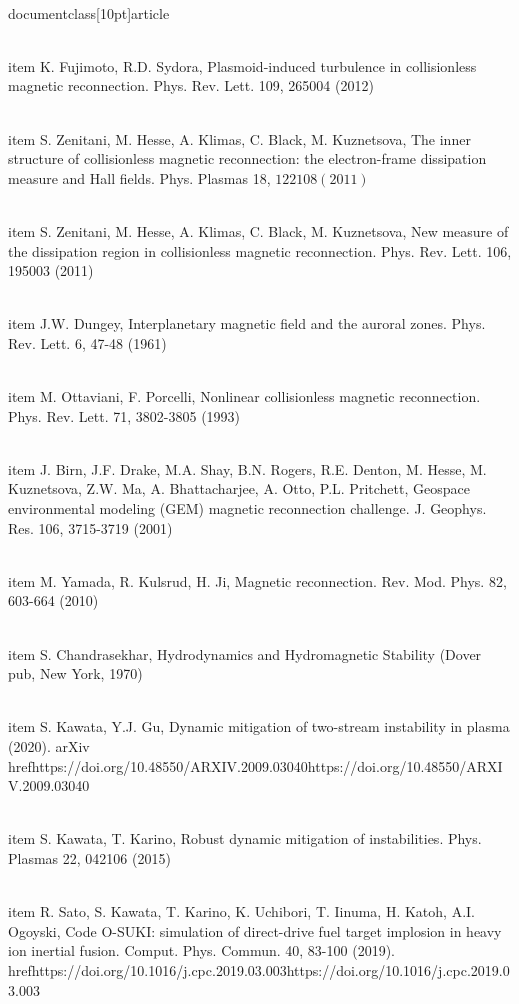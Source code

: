 \\documentclass[10pt]{article}
\begin{document}
{{{{{{  \\item K. Fujimoto, R.D. Sydora, Plasmoid-induced turbulence in collisionless magnetic reconnection. Phys. Rev. Lett. 109, 265004 (2012)

  \\item S. Zenitani, M. Hesse, A. Klimas, C. Black, M. Kuznetsova, The inner structure of collisionless magnetic reconnection: the electron-frame dissipation measure and Hall fields. Phys. Plasmas 18, $122108(2011)$

  \\item S. Zenitani, M. Hesse, A. Klimas, C. Black, M. Kuznetsova, New measure of the dissipation region in collisionless magnetic reconnection. Phys. Rev. Lett. 106, 195003 (2011)

  \\item J.W. Dungey, Interplanetary magnetic field and the auroral zones. Phys. Rev. Lett. 6, 47-48 (1961)

  \\item M. Ottaviani, F. Porcelli, Nonlinear collisionless magnetic reconnection. Phys. Rev. Lett. 71, 3802-3805 (1993)

  \\item J. Birn, J.F. Drake, M.A. Shay, B.N. Rogers, R.E. Denton, M. Hesse, M. Kuznetsova, Z.W. Ma, A. Bhattacharjee, A. Otto, P.L. Pritchett, Geospace environmental modeling (GEM) magnetic reconnection challenge. J. Geophys. Res. 106, 3715-3719 (2001)

  \\item M. Yamada, R. Kulsrud, H. Ji, Magnetic reconnection. Rev. Mod. Phys. 82, 603-664 (2010)

  \\item S. Chandrasekhar, Hydrodynamics and Hydromagnetic Stability (Dover pub, New York, 1970)

  \\item S. Kawata, Y.J. Gu, Dynamic mitigation of two-stream instability in plasma (2020). arXiv \\href{https://doi.org/10.48550/ARXIV.2009.03040}{https://doi.org/10.48550/ARXIV.2009.03040}

  \\item S. Kawata, T. Karino, Robust dynamic mitigation of instabilities. Phys. Plasmas 22, 042106 (2015)

  \\item R. Sato, S. Kawata, T. Karino, K. Uchibori, T. Iinuma, H. Katoh, A.I. Ogoyski, Code O-SUKI: simulation of direct-drive fuel target implosion in heavy ion inertial fusion. Comput. Phys. Commun. 40, 83-100 (2019). \\href{https://doi.org/10.1016/j.cpc.2019.03.003}{https://doi.org/10.1016/j.cpc.2019.03.003}

}}}}}}
\end{document}

